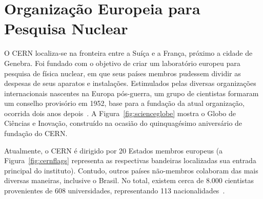 \section{Organização Europeia para Pesquisa Nuclear}

O CERN localiza-se na fronteira entre a Suíça e a França, próximo a cidade de
Genebra. Foi fundado com o objetivo de criar um laboratório europeu para
pesquisa de física nuclear, em que seus países membros pudessem dividir as
despesas de seus aparatos e instalações. Estimulados pelas diversas organizações
internacionais nascentes na Europa pós-guerra, um grupo de cientistas formaram
um conselho provisório em 1952, base para a fundação da atual organização,
ocorrida dois anos depois~\cite{ACZEL2012}. A Figura~\ref{fig:scienceglobe} mostra o
Globo de Ciências e Inovação, construído na ocasião do quinquagésimo aniversário
de fundação do CERN.

Atualmente, o CERN é dirigido por 20 Estados membros europeus (a
Figura~\ref{fig:cernflags} representa as respectivas bandeiras localizadas sua
entrada principal do instituto).  Contudo, outros países não-membros colaboram
das mais diversas maneiras, inclusive o Brasil.  No total, existem cerca de
8.000 cientistas provenientes de 608 universidades, representando 113
nacionalidades~\cite{ref:cern_www}.

